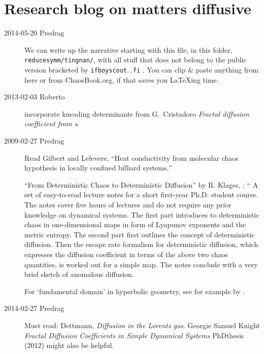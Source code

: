 
	
\chapter{Research blog on matters diffusive}
\label{c-DailyBlog}




\begin{description}

\item[2014-05-20 Predrag]
We can write up the narrative starting with this file,
in this folder, \texttt{reducesymm/tingnan/},
with all stuff that does not belong to the public version
bracketed by \texttt{ifboyscout}...\texttt{fi} .
You can clip \& paste anything from here or from
ChaosBook.org, if that saves you LaTeXing time.

\item[2013-02-03 Roberto]
incorporate kneading determinants from
G.~Cristadoro
{\em Fractal diffusion coefficient from {\dzeta}s}.

\item[2009-02-27 Predrag]
Read  Gilbert  and Lefevere,
    ``Heat conductivity from molecular chaos hypothesis
             in locally confined billiard systems,''

``From Deterministic Chaos to Deterministic Diffusion''
by R. Klages, : ``
A set of easy-to-read lecture notes for a short first-year Ph.D.
student course. The notes cover five hours of lectures and
do not require any prior knowledge on dynamical systems. The first part introduces
to deterministic chaos in one-dimensional maps in form of Lyapunov exponents
and the metric entropy. The second part first outlines the concept of
deterministic diffusion. Then the escape rate formalism for deterministic
diffusion, which expresses the diffusion coefficient in terms of the above two
chaos quantities, is worked out for a simple map. The notes conclude with a
very brief sketch of anomalous diffusion.

For `fundamental domain' in hyperbolic geometry, see for example
by .

\item[2014-02-27 Predrag] Must read:
Dettmann, {\em Diffusion in the {Lorentz} gas}.
Georgie Samuel Knight {\em Fractal Diffusion Coefficients in Simple
Dynamical Systems}
{PhDthesis} (2012) might also be helpful.


\end{description}
